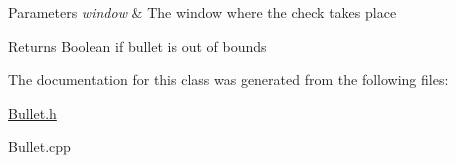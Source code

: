 \begin{DoxyParams}{Parameters}
{\em window} & The window where the check takes place \\
\hline
\end{DoxyParams}
\begin{DoxyReturn}{Returns}
Boolean if bullet is out of bounds 
\end{DoxyReturn}


The documentation for this class was generated from the following files\+:\begin{DoxyCompactItemize}
\item 
\hyperlink{_bullet_8h}{Bullet.\+h}\item 
Bullet.\+cpp\end{DoxyCompactItemize}
